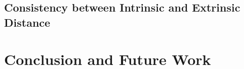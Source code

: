 \documentclass[a4paper, fontsize=12pt,
parskip=half,	%
department=FakIM,  %
twoside, %
DIV=15,BCOR=10mm, %
]{OTHRreprt}%
\begin{document}
            \section{Consistency between Intrinsic and Extrinsic Distance}\label{exp:Intrinsic_vs_Extrinsic}
            

        \chapter{Conclusion and Future Work}\label{conc}
        
        
        \cleardoublepage


        
         \cleardoublepage
       
       \makedeclaration
    
\end{document}

